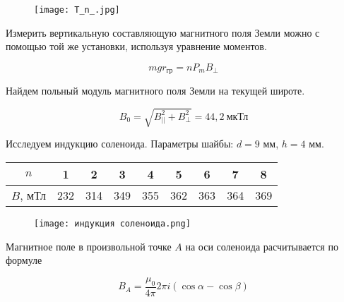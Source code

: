     \begin{figure}[h!]
        \centering
        \texttt{[image: T\_n\_.jpg]}
        \caption{}
    \end{figure}

    \begin{center}
    \end{center}

    Измерить вертикальную составляющую магнитного поля Земли можно с помощью той же установки, используя уравнение моментов.

    \begin{equation*}
        m g r_{\text{гр}} = n P_m B_{\perp}
    \end{equation*}

    \begin{center}
    \end{center}

    Найдем польный модуль магнитного поля Земли на текущей широте.

    \begin{equation*}
        B_0 = \sqrt{B_{||}^2 + B_{\perp}^2} = 44,2 ~ \text{мкТл}
    \end{equation*}

    Исследуем индукцию соленоида. Параметры шайбы: $d = 9$ мм, $h = 4$ мм.

    \begin{table}[h!]
        \begin{center}
            \begin{tabular}{|c|c|c|c|c|c|c|c|c|}
                \hline
                $n$      & 1   & 2   & 3   & 4   & 5   & 6   & 7   & 8   \\ \hline
                $B$, мТл & 232 & 314 & 349 & 355 & 362 & 363 & 364 & 369 \\ \hline
            \end{tabular}
        \end{center}
    \end{table}

    \begin{figure}[h!]
        \centering
        \texttt{[image: индукция соленоида.png]}
        \caption{}
    \end{figure}

    Магнитное поле в произвольной точке $A$ на оси соленоида расчитывается по формуле

    \begin{equation*}
        B_A = \frac{\mu_0}{4 \pi} 2 \pi i (\cos \alpha - \cos \beta)
    \end{equation*}


